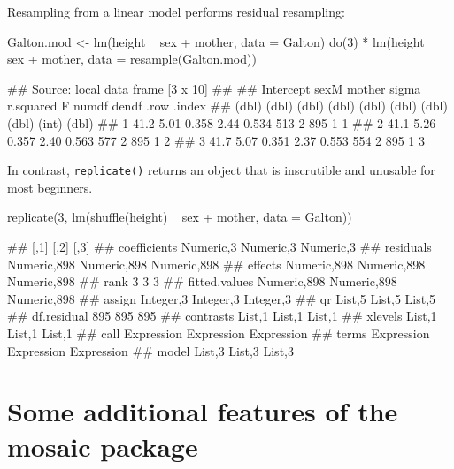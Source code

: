 \noindent
Resampling from a linear model performs residual resampling:

\begin{Schunk}
\begin{Sinput}
Galton.mod <- lm(height ~ sex + mother, data = Galton)
do(3) * lm(height ~ sex + mother, data = resample(Galton.mod))
\end{Sinput}
\begin{Soutput}
## Source: local data frame [3 x 10]
## 
##   Intercept  sexM mother sigma r.squared     F numdf dendf  .row .index
##       (dbl) (dbl)  (dbl) (dbl)     (dbl) (dbl) (dbl) (dbl) (int)  (dbl)
## 1      41.2  5.01  0.358  2.44     0.534   513     2   895     1      1
## 2      41.1  5.26  0.357  2.40     0.563   577     2   895     1      2
## 3      41.7  5.07  0.351  2.37     0.553   554     2   895     1      3
\end{Soutput}
\end{Schunk}

\noindent
In contrast, \texttt{replicate()} returns an object that is inscrutible
and unusable for most beginners.

\begin{Schunk}
\begin{Sinput}
replicate(3, lm(shuffle(height) ~ sex + mother, data = Galton))
\end{Sinput}
\begin{Soutput}
##               [,1]        [,2]        [,3]       
## coefficients  Numeric,3   Numeric,3   Numeric,3  
## residuals     Numeric,898 Numeric,898 Numeric,898
## effects       Numeric,898 Numeric,898 Numeric,898
## rank          3           3           3          
## fitted.values Numeric,898 Numeric,898 Numeric,898
## assign        Integer,3   Integer,3   Integer,3  
## qr            List,5      List,5      List,5     
## df.residual   895         895         895        
## contrasts     List,1      List,1      List,1     
## xlevels       List,1      List,1      List,1     
## call          Expression  Expression  Expression 
## terms         Expression  Expression  Expression 
## model         List,3      List,3      List,3
\end{Soutput}
\end{Schunk}

\section{Some additional features of the mosaic
package}\label{some-additional-features-of-the-mosaic-package}

